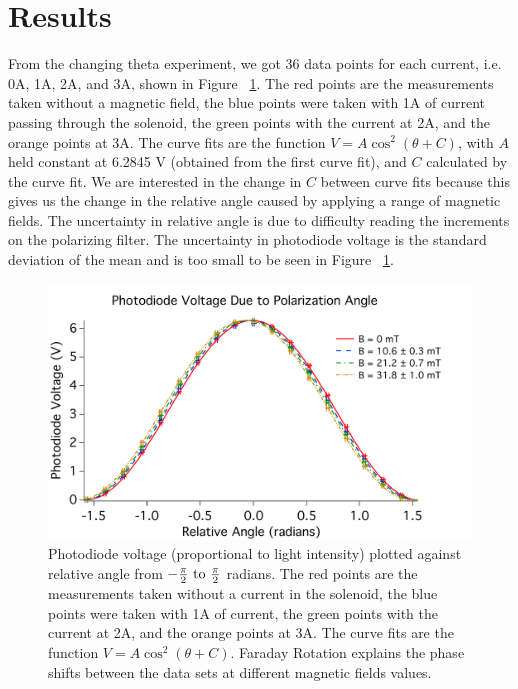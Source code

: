 \documentclass[prb,preprint]{revtex4-1}
\begin{document}
\section{Results}

From the changing theta experiment, we got 36 data points for each current, i.e. 0A, 1A, 2A, and 3A, shown in Figure ~\ref{V_ThetaRel_Plot}. The red points are the measurements taken without a magnetic field, the blue points were taken with 1A of current passing through the solenoid, the green points with the current at 2A, and the orange points at 3A.  The curve fits are the function $V = A \cos^{2}(\theta + C)$, with $A$ held constant at 6.2845 V (obtained from the first curve fit), and $C$ calculated by the curve fit. We are interested in the change in $C$ between curve fits because this gives us the change in the relative angle caused by applying a range of magnetic fields. The uncertainty in relative angle is due to difficulty reading the increments on the polarizing filter. The uncertainty in photodiode voltage is the standard deviation of the mean and is too small to be seen in Figure ~\ref{V_ThetaRel_Plot}.

\begin{figure}[h!]
\centering

\includegraphics[width=6in]{V_ThetaRel_Plot.pdf}
\caption{Photodiode voltage (proportional to light intensity) plotted against relative angle from $-\frac{\pi}{2} \rm{\ to\ } \frac{\pi}{2}$ radians.  The red points are the measurements taken without a current in the solenoid, the blue points were taken with 1A of current, the green points with the current at 2A, and the orange points at 3A.  The curve fits are the function $V = A \cos^{2}(\theta + C) $. Faraday Rotation explains the phase shifts between the data sets at different magnetic fields values.}

\label{V_ThetaRel_Plot}
\end{figure}
\end{document}

